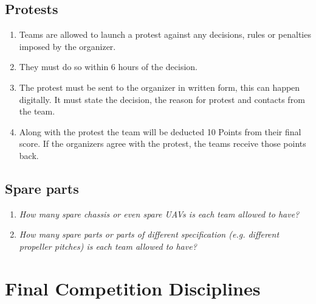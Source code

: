     \subsection{Protests}
    \begin{enumerate}
      \item Teams are allowed to launch a protest against any decisions, rules or penalties imposed by the organizer.
      \item They must do so within 6 hours of the decision. 
      \item The protest must be sent to the organizer in written form, this can happen digitally. It must state the decision, the reason for protest and contacts from the team.
      \item Along with the protest the team will be deducted 10 Points from their final score. If the organizers agree with the protest, the teams receive those points back. 
    \end{enumerate}

    \subsection{Spare parts}
    \begin{enumerate}
      \item \emph{How many spare chassis or even spare UAVs is each team allowed to have?}
      \item \emph{How many spare parts or parts of different specification (e.g. different propeller pitches) is each team allowed to have?}
    \end{enumerate}

    \section{Final Competition Disciplines}


